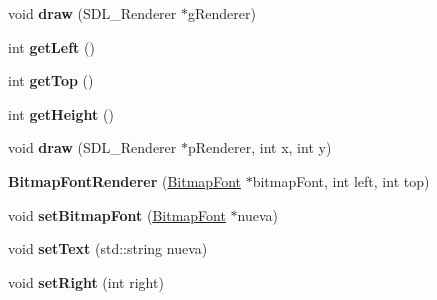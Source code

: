 \begin{DoxyCompactItemize}
\item 
void {\bfseries draw} (S\+D\+L\+\_\+\+Renderer $\ast$g\+Renderer)\hypertarget{class_bitmap_font_renderer_a5b6268da07617eb4af60dd5c29e3c0ba}{}\label{class_bitmap_font_renderer_a5b6268da07617eb4af60dd5c29e3c0ba}

\item 
int {\bfseries get\+Left} ()\hypertarget{class_bitmap_font_renderer_a9a46c5f2dc06587090df845a1a025cfc}{}\label{class_bitmap_font_renderer_a9a46c5f2dc06587090df845a1a025cfc}

\item 
int {\bfseries get\+Top} ()\hypertarget{class_bitmap_font_renderer_aa4944663fb8a76418ebbbf90293b7bf0}{}\label{class_bitmap_font_renderer_aa4944663fb8a76418ebbbf90293b7bf0}

\item 
int {\bfseries get\+Height} ()\hypertarget{class_bitmap_font_renderer_a1f3af2d5ee811b92b0974d667bea5f02}{}\label{class_bitmap_font_renderer_a1f3af2d5ee811b92b0974d667bea5f02}

\item 
void {\bfseries draw} (S\+D\+L\+\_\+\+Renderer $\ast$p\+Renderer, int x, int y)\hypertarget{class_bitmap_font_renderer_a1d64e6aeb450d94e7f32f1634a4c9d5e}{}\label{class_bitmap_font_renderer_a1d64e6aeb450d94e7f32f1634a4c9d5e}

\item 
{\bfseries Bitmap\+Font\+Renderer} (\hyperlink{class_bitmap_font}{Bitmap\+Font} $\ast$bitmap\+Font, int left, int top)\hypertarget{class_bitmap_font_renderer_a65e9126c5691f61c2d992a9ab996b79d}{}\label{class_bitmap_font_renderer_a65e9126c5691f61c2d992a9ab996b79d}

\item 
void {\bfseries set\+Bitmap\+Font} (\hyperlink{class_bitmap_font}{Bitmap\+Font} $\ast$nueva)\hypertarget{class_bitmap_font_renderer_a197dc934c3a667a0d0914044eafc8c79}{}\label{class_bitmap_font_renderer_a197dc934c3a667a0d0914044eafc8c79}

\item 
void {\bfseries set\+Text} (std\+::string nueva)\hypertarget{class_bitmap_font_renderer_a8d0a1192a86938db8d62f6c0e2ba337d}{}\label{class_bitmap_font_renderer_a8d0a1192a86938db8d62f6c0e2ba337d}

\item 
void {\bfseries set\+Right} (int right)\hypertarget{class_bitmap_font_renderer_a3dee9252829f28f6feacb2d1a44afabb}{}\label{class_bitmap_font_renderer_a3dee9252829f28f6feacb2d1a44afabb}


\end{DoxyCompactItemize}
